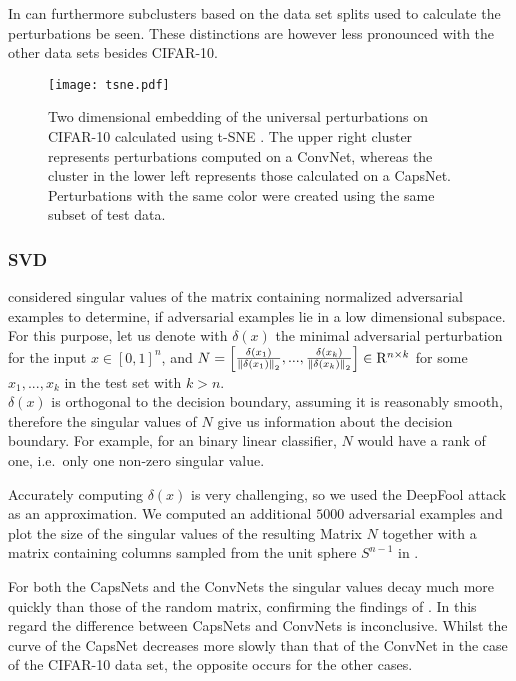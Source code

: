 In  can furthermore subclusters based on the data set splits used to calculate the perturbations be seen.
These distinctions are however less pronounced with the other data sets besides CIFAR-10.

\begin{figure}
	\texttt{[image: tsne.pdf]}
	\caption[t-SNE Plot of Universal Perturbations]{Two dimensional embedding of the universal perturbations on CIFAR-10 calculated using t-SNE \citep{tsne}. The upper right cluster represents perturbations computed on a ConvNet, whereas the cluster in the lower left represents those calculated on a CapsNet. Perturbations with the same color were created using the same subset of test data.}
	\label{fig:tsne}
\end{figure}


\subsubsection{SVD}
\citet{universal} considered singular values of the matrix containing normalized adversarial examples to determine, if adversarial examples lie in a low dimensional subspace. \\
For this purpose, let us denote with $\delta(x)$ the minimal adversarial perturbation for the input $x \in [0,1]^n$,
and $ N = \begin{bmatrix}
\frac{\delta(x_1)} {\left \lVert \delta(x_1) \right \rVert _{2}},  ...,  \frac{\delta(x_k)} {\left \lVert \delta(x_k) \right \rVert _{2}} 
\end{bmatrix}
\in \mathrm{R}^{n \times k}
$ for some $x_1, ..., x_k$ in the test set with $k > n$. \\
$\delta(x)$ is orthogonal to the decision boundary, assuming it is reasonably smooth, therefore the singular values of $N$ give us information about the decision boundary. For example, for an binary linear classifier, $N$ would have a rank of one, i.e.\ only one non-zero singular value.

Accurately computing $\delta(x)$ is very challenging, so we used the DeepFool attack as an approximation. We computed an additional $5000$ adversarial examples and plot the size of the singular values of the resulting Matrix $N$ together with a matrix containing columns sampled from the unit sphere $S^{n-1}$ in .

For both the CapsNets and the ConvNets the singular values decay much more quickly than those of the random matrix, confirming the findings of \citet{universal}.
In this regard the difference between CapsNets and ConvNets is inconclusive.
Whilst the curve of the CapsNet decreases more slowly than that of the ConvNet in the case of the CIFAR-10 data set, the opposite occurs for the other cases.


